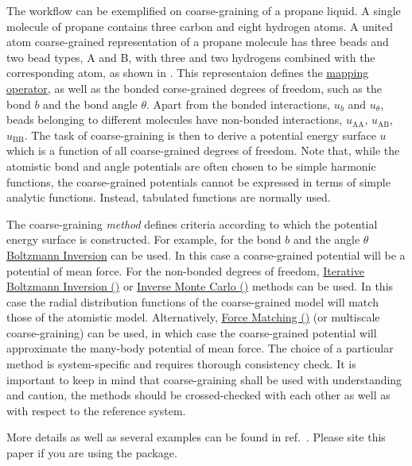 The workflow can be exemplified on coarse-graining of a propane liquid. A single molecule of propane contains three carbon and eight hydrogen atoms. A united atom coarse-grained representation of a propane molecule has three beads and two bead types, A and B, with three and two hydrogens combined with the corresponding atom, as shown in . This representaion defines the \hyperref[sec:mapping_operator]{mapping operator}, as well as the bonded corse-grained degrees of freedom, such as the bond $b$ and the bond angle $\theta$. Apart from the bonded interactions, $u_b$ and $u_\theta$, beads belonging to different molecules have non-bonded interactions, $u_\text{AA}$, $u_\text{AB}$, $u_\text{BB}$. The task of coarse-graining is then to derive a potential energy surface $u$ which is a function of all coarse-grained degrees of freedom. Note that, while the atomistic bond and angle potentials are often chosen to be simple harmonic functions, the coarse-grained potentials cannot be expressed in terms of simple analytic functions. Instead, tabulated functions are normally used. 

The coarse-graining {\em method} defines criteria according to which the potential energy surface is constructed. For example, for the bond $b$ and the angle $\theta$  \hyperref[sec:bi]{Boltzmann Inversion} can be used. In this case a coarse-grained potential will be a potential of mean force. For the non-bonded degrees of freedom, 
\hyperref[sec:ibi]{Iterative Boltzmann Inversion (\ibi)} or \hyperref[sec:imc]{Inverse Monte Carlo (\imc)} methods can be used. In this case the radial distribution functions of the coarse-grained model will match those of the atomistic model. Alternatively, \hyperref[sec:fm]{Force Matching (\fm)} (or multiscale coarse-graining) can be used, in which case the coarse-grained potential will approximate the many-body potential of mean force. The choice of a particular method is system-specific and requires thorough consistency check. It is important to keep in mind that coarse-graining shall be used with understanding and caution, the methods should be crossed-checked with each other as well as with respect to the reference system.

More details as well as several examples can be found in ref.~\cite{Ruehle:2009.a}. Please site this paper if you are using the package. 
